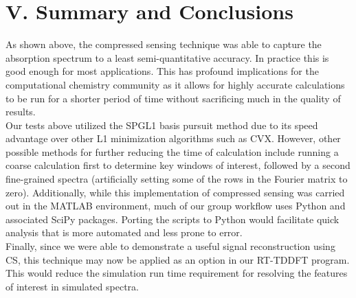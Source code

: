 \documentclass[11pt]{article}
\begin{document}
\section*{V.	Summary and Conclusions} %

\par As shown above, the compressed sensing technique was able to capture the absorption spectrum to a least semi-quantitative accuracy. In practice this is good enough for most applications. This has profound implications for the computational chemistry community as it allows for highly accurate calculations to be run for a shorter period of time without sacrificing much in the quality of results.\\ 

Our tests above utilized the SPGL1 basis pursuit method due to its speed advantage over other L1 minimization algorithms such as CVX. However, other possible methods for further reducing the time of calculation include running a coarse calculation first to determine key windows of interest, followed by a second fine-grained spectra (artificially setting some of the rows in the Fourier matrix to zero). Additionally, while this implementation of compressed sensing was carried out in the MATLAB environment, much of our group workflow uses Python and associated SciPy packages. Porting the scripts to Python would facilitate quick analysis that is more automated and less prone to error.\\

Finally, since we were able to demonstrate a useful signal reconstruction using CS, this technique may now be applied as an option in our RT-TDDFT program.  This would reduce the simulation run time requirement for resolving the features of interest in simulated spectra.\\ 

\pagebreak

\end{document}
